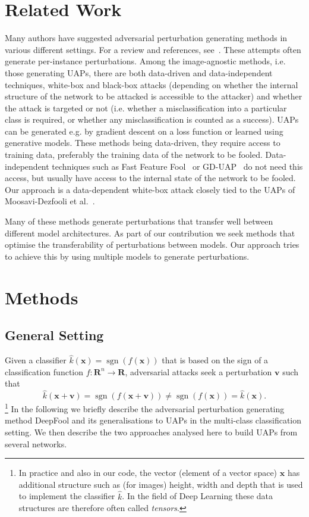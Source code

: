 \documentclass[runningheads]{llncs}
\DeclareMathOperator{\sgn}{sgn}
\newcommand{\xb}{\ensuremath{\mathbf{x}}}
\newcommand{\vb}{\ensuremath{\mathbf{v}}}
\begin{document}
\section{Related Work}\label{sec:relatedWork}
Many authors have suggested adversarial perturbation generating methods in various different settings. For a review and references, see~\cite{Chaubey2020UniversalAP}. These attempts often generate per-instance perturbations. Among the image-agnostic methods, i.e. those generating UAPs, there are both data-driven and data-independent techniques, white-box and black-box attacks (depending on whether the internal structure of the network to be attacked is accessible to the attacker) and whether the attack is targeted or not (i.e. whether a misclassification into a particular class is required, or whether any misclassification is counted as a success). UAPs can be generated e.g. by gradient descent on a loss function or learned using generative models. These methods being data-driven, they require access to training data, preferably the training data of the network to be fooled. Data-independent techniques such as Fast Feature Fool~\cite{Mopuri2017FastFF} or GD-UAP~\cite{DBLP:journals/corr/abs-1801-08092} do not need this access, but usually have access to the internal state of the network to be fooled. Our approach is a data-dependent white-box attack closely tied to the UAPs of Moosavi-Dezfooli et al.~\cite{moosavidezfooli_universal_2017}.

Many of these methods generate perturbations that transfer well between different model architectures. As part of our contribution we seek methods that optimise the transferability of perturbations between models. Our approach tries to achieve this by using multiple models to generate perturbations.

\section{Methods}\label{sec:methods}
\subsection{General Setting}
Given a classifier \(\hat{k}(\xb)=\sgn\left(f(\xb)\right)\) that is based on the sign of a classification function \(f:\mathbf{R}^n\rightarrow\mathbf{R}\), adversarial attacks seek a perturbation \(\vb\) such that \[\hat{k}(\xb+\vb)=\sgn\left(f(\xb+\vb)\right)\neq \sgn\left(f(\xb)\right)=\hat{k}(\xb).\] 
\footnote{In practice and also in our code, the vector (element of a vector space) \(\xb\) has additional structure such as (for images) height, width and depth that is used to implement the classifier \(\hat{k}\). In the field of Deep Learning these data structures are therefore often called \emph{tensors}.}
In the following we briefly describe the adversarial perturbation generating method DeepFool and its generalisations to UAPs in the multi-class classification setting. We then describe the two approaches analysed here to build UAPs from several networks.
\end{document}
